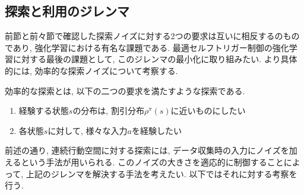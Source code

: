 \documentclass{jsarticle}
\begin{document}
\subsection{探索と利用のジレンマ}
前節と前々節で確認した探索ノイズに対する2つの要求は互いに相反するのものであり, 強化学習における有名な課題である. 最適セルフトリガー制御の強化学習に対する最後の課題として, このジレンマの最小化に取り組みたい. より具体的には, 効率的な探索ノイズについて考察する.\par
効率的な探索とは, 以下の二つの要求を満たすような探索である.
\begin{enumerate} 
	\item 経験する状態$s$の分布は, 割引分布$\rho^{\pi}(s)$に近いものにしたい
	\item 各状態$s$に対して, 様々な入力$a$を経験したい
\end{enumerate}
前述の通り, 連続行動空間に対する探索には, データ収集時の入力にノイズを加えるという手法が用いられる. このノイズの大きさを適応的に制御することによって, 上記のジレンマを解決する手法を考えたい. 以下ではそれに対する考察を行う.
\end{document}
